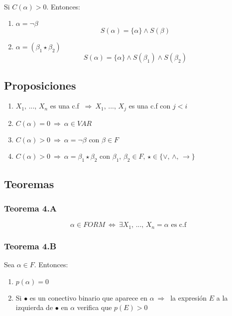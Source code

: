 \documentclass{article}
\newcommand{\comma}{,\,}                                %
\newcommand{\Rightarrows}{\: \Rightarrow \:}            %
\newcommand{\Leftrightarrows}{\: \Leftrightarrow \:}    %
\begin{document}
\leavevmode\\Si $C(\alpha) > 0$. Entonces:
\begin{enumerate}
	\item $\alpha = \neg \beta$
		\begin{equation*}
			S(\alpha) = \{\alpha\} \wedge S(\beta)
		\end{equation*}
	\item $\alpha = (\beta_1 \star \beta_2)$
		\begin{equation*}
			S(\alpha) = \{\alpha\} \wedge S(\beta_1) \wedge S(\beta_2)
		\end{equation*}
\end{enumerate}


\subsection{Proposiciones}
\begin{enumerate}
	\item $X_1 \comma ... \comma X_n$ es una c.f $\Rightarrows X_1 \comma ... \comma X_j$ es una c.f
		con $j < i$
	\item $C(\alpha) = 0 \Rightarrows \alpha \in VAR$
	\item $C(\alpha) > 0 \Rightarrows \alpha = \neg \beta$ con $\beta \in F$
	\item $C(\alpha) > 0 \Rightarrows \alpha = \beta_1 \star \beta_2$ con $\beta_1 \comma \beta_2 \in F \comma \star \in \{ \vee \comma \wedge \comma \rightarrow \}$
\end{enumerate}

\subsection{Teoremas}
\subsubsection{Teorema 4.A}
\begin{equation*}
	\alpha \in FORM \Leftrightarrows \exists X_1 \comma ... \comma X_n = \alpha 
	\text{ es c.f }
\end{equation*}

\subsubsection{Teorema 4.B}
Sea $\alpha \in F$. Entonces:
\begin{enumerate}
	\item $p(\alpha) = 0$
	\item Si $\bullet$ es un conectivo binario que aparece en $\alpha 
		\Rightarrows$ la expresión $E$ a la izquierda de $\bullet$ en $\alpha$ verifica que
		$p(E) > 0$
\end{enumerate}
\end{document}
